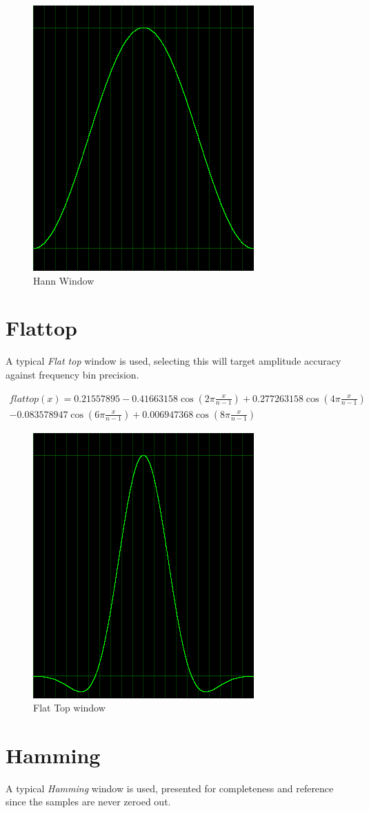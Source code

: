 \documentclass[10pt,a4paper]{report}
\begin{document}
\begin{appendices}
\begin{figure}[H]
	\centering
	\includegraphics[width=0.4\linewidth]{images/windows/window-hann.png}
	\caption[Hann Window]{Hann Window}
	\label{fig:window-hann}
\end{figure}

\newpage
\section{Flattop}
A typical \textit{Flat top} window is used, selecting this will target amplitude accuracy against frequency bin precision.

\begin{align*}
flattop(x)=0.21557895 - 0.41663158\cos(2\pi\frac{x}{n-1})+ 0.277263158\cos(4\pi\frac{x}{n-1})\\
- 0.083578947\cos(6\pi\frac{x}{n-1}) + 0.006947368\cos(8\pi\frac{x}{n-1})
\end{align*}

\begin{figure}[H]
	\centering
	\includegraphics[width=0.4\linewidth]{images/windows/window-flattop.png}
	\caption[Flat Top window]{Flat Top window}
	\label{fig:window-flattop}
\end{figure}

\newpage
\section{Hamming}
A typical \textit{Hamming} window is used, presented for completeness and reference since the samples are never zeroed out.


\end{appendices}
\end{document}
